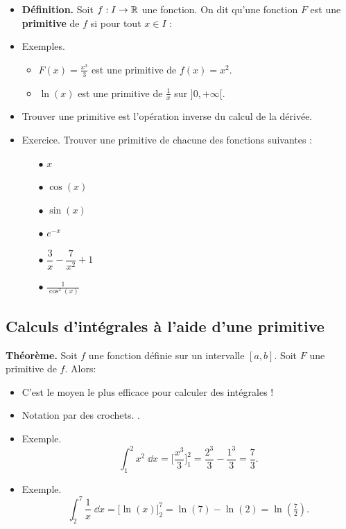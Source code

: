 \documentclass[11pt,class=report,crop=false]{standalone}
\begin{document}
\begin{itemize}
  \item \textbf{Définition.} Soit $f : I \to \mathbb{R}$ une fonction.
On dit qu'une fonction $F$ est une \textbf{primitive} de $f$ si pour tout $x\in I$ :


  \item Exemples.
\begin{itemize}
	\item $F(x)=\displaystyle\frac{x^3}{3}$ est une primitive de $f(x)=x^2$.
	\item $\ln(x)$ est une primitive de $\frac1x$ sur $]0,+\infty[$.
\end{itemize}

  \item Trouver une primitive est l'opération inverse du calcul de la dérivée.

  \item Exercice. Trouver une primitive de chacune des fonctions suivantes :
\begin{multicols}{2}
\begin{itemize}
	\item[$\bullet$] $x$
    \item[$\bullet$] $\cos(x)$
    \item[$\bullet$] $\sin(x)$
    \item[$\bullet$] $e^{-x}$
    \item[$\bullet$] $\dfrac3x - \dfrac{7}{x^2} + 1$
    \item[$\bullet$] $\frac{1}{\cos^2(x)}$
\end{itemize}
\end{multicols}
\end{itemize}


\subsection*{Calculs d'intégrales à l'aide d'une primitive}


\textbf{Théorème.}
Soit $f$ une fonction définie sur un intervalle $[a,b]$.
Soit $F$ une primitive de $f$. Alors:

\begin{itemize}
  \item C'est le moyen le plus efficace pour calculer des intégrales ! 

  \item Notation par des crochets. 
.

  
  \item Exemple.
  \[\int_{1}^{2}x^2\;\dd x=\bigg[\frac{x^3}{3}\bigg]^2_1=\frac{2^3}{3}-\frac{1^3}{3} = \frac{7}{3}.\]

  \item Exemple. \[\int_{2}^{7}\frac1x \;\dd x =\big[ \ln(x) \big]_2^7= \ln(7) - \ln(2) = \ln\left(\tfrac72\right).\]
\end{itemize}
\end{document}
